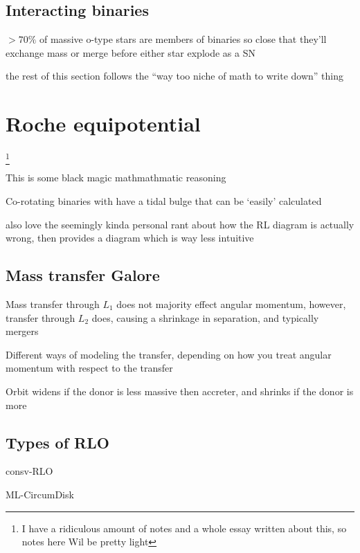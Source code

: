 \documentclass{article}
\begin{document}
\subsection{Interacting binaries}
\begin{list}{-}{}
\item \(> 70\%\) of massive o-type stars are members of binaries so close that they'll exchange mass or merge before either star explode as a SN

\end{list}
the rest of this section follows the ``way too niche of math to write down'' thing

\section{Roche equipotential}\footnote{I have a ridiculous amount of notes and a whole essay written about this, so notes here Wil be pretty light}

\begin{list}{-}{}
\item This is some black magic mathmathmatic reasoning 
\item Co-rotating binaries with have a tidal bulge that can be `easily' calculated
\item also love the seemingly kinda personal rant about how the RL diagram is actually wrong, then provides a diagram which is way less intuitive  
\end{list}

\subsection{Mass transfer Galore}
\begin{list}{-}{}
\item Mass transfer through \(L_1\) does not majority effect angular momentum, however, transfer through \(L_2\) does, causing a shrinkage in separation, and typically mergers
\item Different ways of modeling the transfer, depending on how you treat angular momentum with respect to the transfer
\item Orbit widens if the donor is less massive then accreter, and shrinks if the donor is more
\end{list}

\subsection{Types of RLO}
\begin{list}{-}{}
\item \gls{consv-RLO}
\item \gls{ML-CircumDisk}
\end{list}
\end{document}
